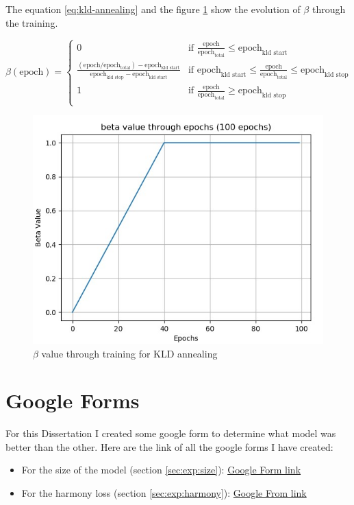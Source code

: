 \documentclass[12pt]{report}
\begin{document}
The equation \ref{eq:kld-annealing} and the figure \ref{fig:beta-annealing} show the evolution of $\beta$ through the training.

\begin{equation}
    \beta (\text{epoch}) =
    \begin{cases}
        0 & \text{if } \frac{\text{epoch}}{\text{epoch}_{\text{total}}} \leq \text{epoch}_{\text{kld start}} \\
        
        \frac{(\text{epoch} / \text{epoch}_{\text{total}}) - \text{epoch}_{\text{kld start}}}{\text{epoch}_{\text{kld stop}} - \text{epoch}_{\text{kld start}}} & \text{if } \text{epoch}_{\text{kld start}} \leq \frac{\text{epoch}}{\text{epoch}_{\text{total}}} \leq \text{epoch}_{\text{kld stop}} \\
        
        1 & \text{if } \frac{\text{epoch}}{\text{epoch}_{\text{total}}} \geq \text{epoch}_{\text{kld stop}} \\
    \end{cases}
    \label{eq:kld-annealing}
\end{equation}

\begin{figure}[htbp]
    \centering
    \includegraphics[width=0.8 \textwidth]{images/nn/training/beta-annealing.jpg}
    \caption{$\beta$ value through training for KLD annealing}
    \label{fig:beta-annealing}
\end{figure}


\section{Google Forms}
\label{appendix:google-forms}


For this Dissertation I created some google form to determine what model was better than the other.
Here are the link of all the google forms I have created:
\begin{itemize}
    \item For the size of the model (section \ref{sec:exp:size}):  \href{https://forms.gle/BdEcYZgYWXPigSdA6}{Google Form link}
    \item For the harmony loss (section \ref{sec:exp:harmony}): \href{https://docs.google.com/forms/d/e/1FAIpQLScZ1ZAkCxwIRiuewNlDUFgZcpEY2O-Yg0T8IEQzp4k9_BCCJg/viewform?usp=sf_link}{Google From link}
\end{itemize}
\end{document}
